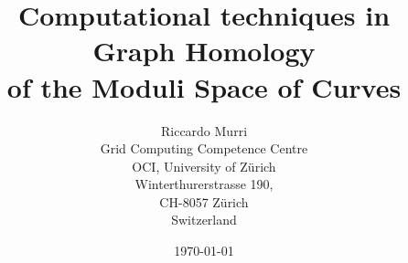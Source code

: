 

\title{%
  Computational techniques in Graph Homology \\
  of the Moduli Space of Curves
}
\date{\today}
\author{
  Riccardo Murri 
  \\ 
  Grid Computing Competence Centre \\
  OCI, University of Z\"urich \\
  Winterthurerstrasse 190, \\
  CH-8057 Z\"urich \\
  Switzerland
}

\maketitle

\setcounter{tocdepth}{2} %

\tableofcontents*

